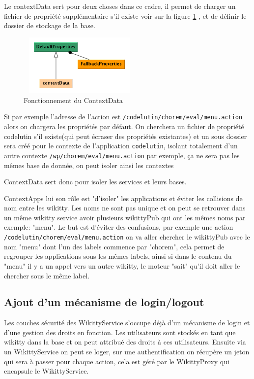 Le contextData sert pour deux choses dans ce cadre, il permet de charger un 
fichier de propriété supplémentaire s'il existe voir sur la figure 
\ref{propertiescontext} , et de définir le dossier de stockage de la base. 

\begin{figure}[!ht]
\centering
\includegraphics[height=3cm,width=6cm]{image/propertiescontext.png}
  		\caption{Fonctionnement du ContextData}
  		\label{propertiescontext}
\end{figure}

Si par exemple l'adresse de l'action est \verb!/codelutin/chorem/eval/menu.action!
alors on chargera les propriétés par défaut. On cherchera un fichier de propriété
codelutin s'il existe(qui peut écraser des propriétés existantes) et un sous dossier
sera créé pour le contexte de l'application \verb!codelutin!, isolant totalement
d'un autre contexte \verb!/wp/chorem/eval/menu.action! par exemple, ça ne sera
pas les mêmes base de donnée, on peut isoler ainsi les contextes

ContextData sert donc pour isoler les services et leurs bases.

ContextApps lui son rôle est "d'isoler" les applications et éviter les collisions
de nom entre les wikitty. Les noms ne sont pas unique et on peut se retrouver
dans un même wikitty service avoir plusieurs wikittyPub qui ont les mêmes noms par
exemple: "menu". Le but est d'éviter des confusions, par exemple une action
\verb!/codelutin/chorem/eval/menu.action! on va aller chercher le wikittyPub 
avec le nom "menu" dont l'un des labels commence par "chorem", cela permet de 
regrouper les applications sous les mêmes labels, ainsi si dans le contenu du 
"menu" il y a un appel vers un autre wikitty, le moteur "sait" qu'il doit 
aller le chercher sous le même label.


\subsection{Ajout d'un mécanisme de login/logout}

Les couches sécurité des WikittyService s'occupe déjà d'un mécanisme de login
et d'une gestion des droits en fonction. Les utilisateurs sont stockés en tant
que wikitty dans la base et on peut attribué des droits à ces utilisateurs.
Ensuite via un WikittyService on peut se loger, sur une authentification on
récupère un jeton qui sera à passer pour chaque action, cela est géré par le
WikittyProxy qui encapsule le WikittyService.

